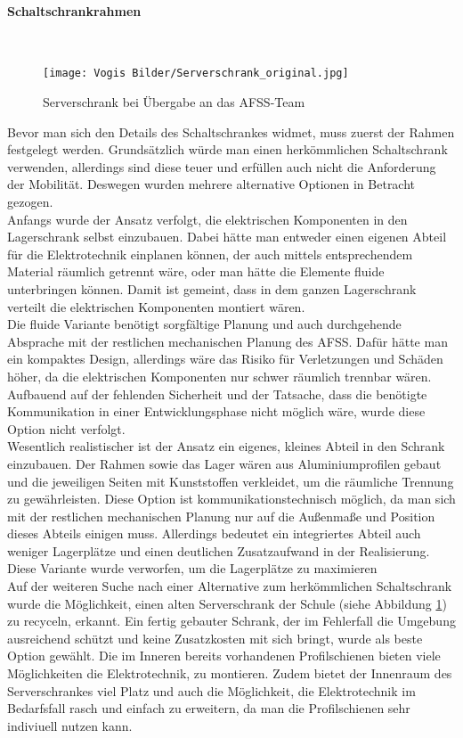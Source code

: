     \paragraph{Schaltschrankrahmen}\mbox{}\\
        \begin{figure}[h]
        \centering
        \texttt{[image: Vogis Bilder/Serverschrank\_original.jpg]}
        \caption{Serverschrank bei Übergabe an das AFSS-Team}
        \label{fig:Serverschrank_original}
    \end{figure}
    Bevor man sich den Details des Schaltschrankes widmet, muss zuerst der Rahmen festgelegt werden. Grundsätzlich würde man einen herkömmlichen Schaltschrank verwenden, allerdings sind diese teuer und erfüllen auch nicht die Anforderung der Mobilität. Deswegen wurden mehrere alternative Optionen in Betracht gezogen.\\
    Anfangs wurde der Ansatz verfolgt, die elektrischen Komponenten in den Lagerschrank selbst einzubauen. Dabei hätte man entweder einen eigenen Abteil für die Elektrotechnik einplanen können, der auch mittels entsprechendem Material räumlich getrennt wäre, oder man hätte die Elemente fluide unterbringen können. Damit ist gemeint, dass in dem ganzen Lagerschrank verteilt die elektrischen Komponenten montiert wären.\\
    Die fluide Variante benötigt sorgfältige Planung und auch durchgehende Absprache mit der restlichen mechanischen Planung des AFSS. Dafür hätte man ein kompaktes Design, allerdings wäre das Risiko für Verletzungen und Schäden höher, da die elektrischen Komponenten nur schwer räumlich trennbar wären. Aufbauend auf der fehlenden Sicherheit und der Tatsache, dass die benötigte Kommunikation in einer Entwicklungsphase nicht möglich wäre, wurde diese Option nicht verfolgt.\\
    Wesentlich realistischer ist der Ansatz ein eigenes, kleines Abteil in den Schrank einzubauen. Der Rahmen sowie das Lager wären aus Aluminiumprofilen gebaut und die jeweiligen Seiten mit Kunststoffen verkleidet, um die räumliche Trennung zu gewährleisten. Diese Option ist kommunikationstechnisch möglich, da man sich mit der restlichen mechanischen Planung nur auf die Außenmaße und Position dieses Abteils einigen muss. Allerdings bedeutet ein integriertes Abteil auch weniger Lagerplätze und einen deutlichen Zusatzaufwand in der Realisierung. Diese Variante wurde verworfen, um die Lagerplätze zu maximieren\\
    Auf der weiteren Suche nach einer Alternative zum herkömmlichen Schaltschrank wurde die Möglichkeit, einen alten Serverschrank der Schule (siehe Abbildung \ref{fig:Serverschrank_original}) zu recyceln, erkannt. Ein fertig gebauter Schrank, der im Fehlerfall die Umgebung ausreichend schützt und keine Zusatzkosten mit sich bringt, wurde als beste Option gewählt. Die im Inneren bereits vorhandenen Profilschienen bieten viele Möglichkeiten die Elektrotechnik, zu montieren. Zudem bietet der Innenraum des Serverschrankes viel Platz und auch die Möglichkeit, die Elektrotechnik im Bedarfsfall rasch und einfach zu erweitern, da man die Profilschienen sehr indiviuell nutzen kann.\\
